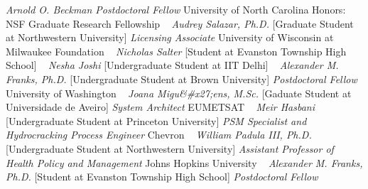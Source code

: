     \textit{Arnold O. Beckman Postdoctoral Fellow}
    \newline
    University of North Carolina
    \newline
    {\footnotesize Honors: NSF Graduate Research Fellowship}
    \newline
~
\Gap{}
\textit{Audrey Salazar, Ph.D.}
    [Graduate Student at Northwestern University]
\newline
    \textit{Licensing Associate}
    \newline
    University of Wisconsin at Milwaukee Foundation
    \newline
~
\Gap{}
\textit{Nicholas Salter}
    [Student at Evanston Township High School]
\newline
~
\Gap{}
\textit{Nesha Joshi}
    [Undergraduate Student at IIT Delhi]
\newline
~
\Gap{}
\textit{Alexander M. Franks, Ph.D.}
    [Undergraduate Student at Brown University]
\newline
    \textit{Postdoctoral Fellow}
    \newline
    University of Washington
    \newline
~
\Gap{}
\textit{Joana Migu\&#x27;ens, M.Sc.}
    [Gaduate Student at Universidade de Aveiro]
\newline
    \textit{System Architect}
    \newline
    EUMETSAT
    \newline
~
\Gap{}
\textit{Meir Hasbani}
    [Undergraduate Student at Princeton University]
\newline
    \textit{PSM Specialist and Hydrocracking Process Engineer}
    \newline
    Chevron
    \newline
~
\Gap{}
\textit{William Padula III, Ph.D.}
    [Undergraduate Student at Northwestern University]
\newline
    \textit{Assistant Professor of Health Policy and Management}
    \newline
    Johns Hopkins University
    \newline
~
\Gap{}
\textit{Alexander M. Franks, Ph.D.}
    [Student at Evanston Township High School]
\newline
    \textit{Postdoctoral Fellow}

